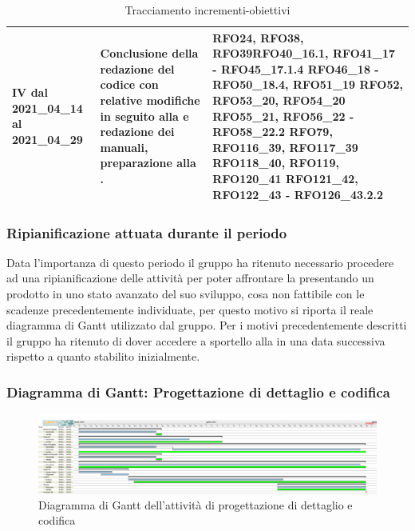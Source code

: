 \begin{table}[H]
\begin{center}
\begin{tabular}{ |C{3cm} C{6cm} C{7cm}| }
			IV dal 2021\_04\_14 al 2021\_04\_29 	& 
			Conclusione della redazione del codice con relative modifiche in seguito alla  e redazione dei manuali, preparazione alla . & RFO24, RFO38, RFO39\newline RFO40\_16.1,
			RFO41\_17 - RFO45\_17.1.4\newline
			RFO46\_18 - RFO50\_18.4, RFO51\_19 \newline
			RFO52, RFO53\_20, RFO54\_20 \newline
			RFO55\_21, RFO56\_22 - RFO58\_22.2 \newline
			RFO79, RFO116\_39, RFO117\_39 \newline RFO118\_40, RFO119, RFO120\_41 \newline
			RFO121\_42, RFO122\_43 - RFO126\_43.2.2 \\ \hline
		\end{tabular}
		\caption{Tracciamento incrementi-obiettivi}
	\end{center}
\end{table}

\newpage
\subsubsection{Ripianificazione attuata durante il periodo} \label{RipianificazionePDettaglio}
Data l'importanza di questo periodo il gruppo ha ritenuto necessario procedere ad una ripianificazione delle attività per poter affrontare la  presentando un prodotto in uno stato avanzato del suo sviluppo, cosa non fattibile con le scadenze precedentemente individuate, per questo motivo si riporta il reale diagramma di Gantt utilizzato dal gruppo. Per i motivi precedentemente descritti il gruppo ha ritenuto di dover accedere a sportello alla  in una data successiva rispetto a quanto stabilito inizialmente.
\subsubsection{Diagramma di Gantt: Progettazione di dettaglio e codifica} \label{GanttPDettaglio}
\begin{figure}[ht]
    \centering
    \includegraphics[width=\textwidth]{Immagini/GanttProgettazioneDiDettaglioECodifica}
    \caption{Diagramma di Gantt dell'attività di progettazione di dettaglio e codifica}
\end{figure}